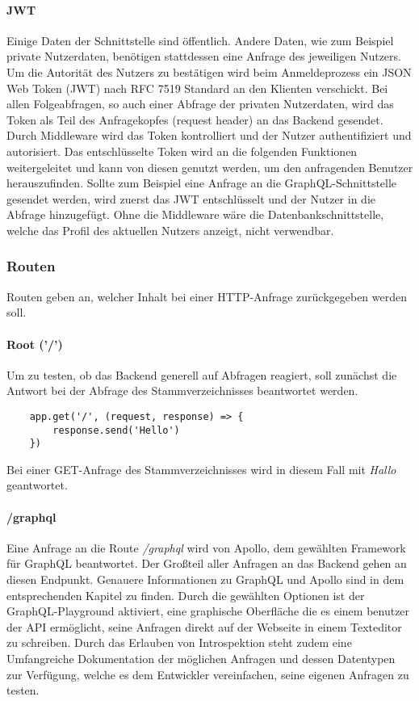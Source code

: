 \paragraph{JWT\\}
Einige Daten der Schnittstelle sind öffentlich. Andere Daten, wie zum Beispiel private Nutzerdaten, benötigen stattdessen eine Anfrage des jeweiligen Nutzers. Um die Autorität des Nutzers zu bestätigen wird beim Anmeldeprozess ein JSON Web Token (JWT) nach RFC 7519 Standard an den Klienten verschickt\cite{RFC7519}. Bei allen Folgeabfragen, so auch einer Abfrage der privaten Nutzerdaten, wird das Token als Teil des Anfragekopfes (request header) an das Backend gesendet. Durch Middleware wird das Token kontrolliert und der Nutzer authentifiziert und autorisiert. Das entschlüsselte Token wird an die folgenden Funktionen weitergeleitet und kann von diesen genutzt werden, um den anfragenden Benutzer herauszufinden. Sollte zum Beispiel eine Anfrage an die GraphQL-Schnittstelle gesendet werden, wird zuerst das JWT entschlüsselt und der Nutzer in die Abfrage hinzugefügt. Ohne die Middleware wäre die Datenbankschnittstelle, welche das Profil des aktuellen Nutzers anzeigt, nicht verwendbar.

\subsubsection{Routen}
Routen geben an, welcher Inhalt bei einer HTTP-Anfrage zurückgegeben werden soll.

\paragraph{Root ('/')\\}
Um zu testen, ob das Backend generell auf Abfragen reagiert, soll zunächst die Antwort bei der Abfrage des Stammverzeichnisses beantwortet werden.
\begin{lstlisting}
    app.get('/', (request, response) => {
        response.send('Hello')
    })
\end{lstlisting}
Bei einer GET-Anfrage des Stammverzeichnisses wird in diesem Fall mit \textit{\glqq Hallo \grqq} geantwortet.

\paragraph{/graphql\\}
Eine Anfrage an die Route \textit{/graphql} wird von Apollo, dem gewählten Framework für GraphQL beantwortet. Der Großteil aller Anfragen an das Backend gehen an diesen Endpunkt. Genauere Informationen zu GraphQL und Apollo sind in dem entsprechenden Kapitel zu finden. Durch die gewählten Optionen ist der GraphQL-Playground aktiviert, eine graphische Oberfläche die es einem benutzer der API ermöglicht, seine Anfragen direkt auf der Webseite in einem Texteditor zu schreiben. Durch das Erlauben von Introspektion steht zudem eine Umfangreiche Dokumentation der möglichen Anfragen und dessen Datentypen zur Verfügung, welche es dem Entwickler vereinfachen, seine eigenen Anfragen zu testen.

